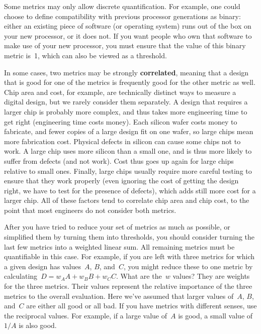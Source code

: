 Some metrics may only allow discrete quantification.  For example,
one could choose to define compatibility with previous processor
generations as binary: either an existing piece of software
(or operating system)
runs out of the box on your new processor, or it does not.  If you 
want people who own that software to make use of your new processor,
you must ensure that the value of this binary metric is~1, which
can also be viewed as a threshold.

In some cases, two metrics may be strongly {\bf correlated}, meaning
that a design that is good for one of the metrics is frequently 
good for the other metric as well.
%
Chip area and cost, for
example, are technically distinct ways to measure a digital design,
but we rarely consider them separately.
%
A design that requires a larger chip is probably more complex,
and thus takes more engineering time to get right (engineering time
costs money).  
%
Each silicon wafer costs money to fabricate, and fewer copies of a 
large design fit on one wafer, so large chips mean more fabrication
cost.
%
Physical defects in silicon can cause some chips not to work.  A large
chip uses more silicon than a small one, and is thus more likely to suffer
from defects (and not work).  Cost thus goes up again for large chips
relative to small ones.
%
Finally, large chips usually require more careful testing to ensure
that they work properly (even ignoring the cost of getting the design
right, we have to test for the presence of defects), which adds still
more cost for a larger chip.
%
All of these factors tend to correlate chip area and chip cost, to the
point that most engineers do not consider both metrics.


After you have tried to reduce your set of metrics as much as possible,
or simplified them by turning them into thresholds, you should consider
turning the last few metrics into a weighted linear sum.  All remaining
metrics must be quantifiable in this case.
%
For example, if you are left with three metrics for which a given
design has values~$A$, $B$, and~$C$, you might reduce these to one
metric by calculating~$D=w_AA+w_BB+w_CC$.  What are the~$w$ values?
They are weights for the three metrics.  Their values represent the
relative importance of the three metrics to the overall evaluation.
Here we've assumed that larger values of~$A$, $B$, and~$C$ are either
all good or all bad.  If you have metrics with different senses,
use the reciprocal values.  For example, if a large value of~$A$ is good,
a small value of~$1/A$ is also good.  

